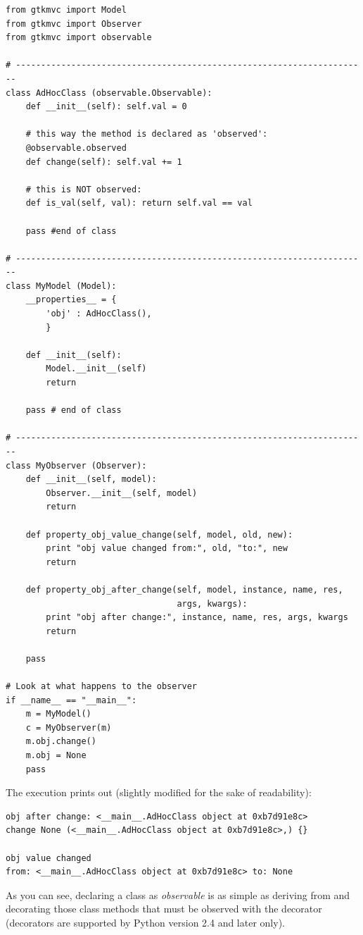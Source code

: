 { \codesize 
\begin{verbatim} 
from gtkmvc import Model
from gtkmvc import Observer
from gtkmvc import observable

# ----------------------------------------------------------------------
class AdHocClass (observable.Observable):
    def __init__(self): self.val = 0

    # this way the method is declared as 'observed':
    @observable.observed 
    def change(self): self.val += 1

    # this is NOT observed:
    def is_val(self, val): return self.val == val

    pass #end of class

# ----------------------------------------------------------------------
class MyModel (Model):
    __properties__ = {
        'obj' : AdHocClass(),
        }

    def __init__(self):
        Model.__init__(self)
        return    

    pass # end of class

# ----------------------------------------------------------------------
class MyObserver (Observer):
    def __init__(self, model):
        Observer.__init__(self, model)
        return

    def property_obj_value_change(self, model, old, new):
        print "obj value changed from:", old, "to:", new 
        return

    def property_obj_after_change(self, model, instance, name, res,
                                  args, kwargs):
        print "obj after change:", instance, name, res, args, kwargs
        return

    pass

# Look at what happens to the observer
if __name__ == "__main__":
    m = MyModel()
    c = MyObserver(m)
    m.obj.change()
    m.obj = None
    pass
\end{verbatim}
}

The execution prints out (slightly modified for the sake of
readability):

{ \codesize 
\begin{verbatim} 
obj after change: <__main__.AdHocClass object at 0xb7d91e8c> 
change None (<__main__.AdHocClass object at 0xb7d91e8c>,) {}

obj value changed 
from: <__main__.AdHocClass object at 0xb7d91e8c> to: None
\end{verbatim}
}

As you can see, declaring a class as \emph{observable} is as simple as
deriving from  and decorating
those class methods that must be observed with the decorator 
 (decorators are supported by
Python version 2.4 and later only). 

